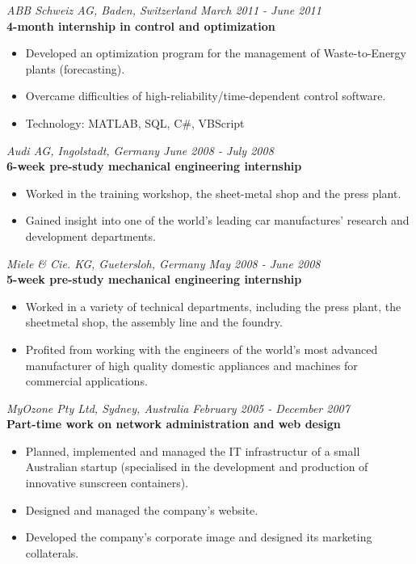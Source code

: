 \documentclass[margin]{res}
\begin{document}
\begin{resume}
  {\it ABB Schweiz AG, Baden, Switzerland \hfill March 2011 - June 2011} \\
  {\bf 4-month internship in control and optimization}
  \begin{itemize} \itemsep -0.5pt 
  \item Developed an optimization program for the management of Waste-to-Energy plants (forecasting).
  \item Overcame difficulties of high-reliability/time-dependent control software.
  \item Technology: MATLAB, SQL, C\#, VBScript
  \end{itemize}
  {\it Audi AG, Ingolstadt, Germany \hfill June 2008 - July 2008} \\
  {\bf 6-week pre-study mechanical engineering internship}
  \begin{itemize} \itemsep -0.5pt 
  \item Worked in the training workshop, the sheet-metal shop and the press plant.
  \item Gained insight into one of the world’s leading car manufactures’ research and development departments.
  \end{itemize}
  {\it Miele \& Cie. KG, Guetersloh, Germany \hfill May 2008 - June 2008} \\
  {\bf 5-week pre-study mechanical engineering internship}
  \begin{itemize} \itemsep -0.5pt
  \item Worked in a variety of technical departments, including the press plant, the sheetmetal shop, the assembly line and the foundry.
  \item Profited from working with the engineers of the world’s most advanced manufacturer of high quality domestic appliances and machines for commercial applications.
  \end{itemize}
  {\it MyOzone Pty Ltd, Sydney, Australia \hfill February 2005 - December 2007} \\
  {\bf Part-time work on network administration and web design}
  \begin{itemize} \itemsep -0.5pt
  \item Planned, implemented and managed the IT infrastructur of a small Australian startup (specialised in the development and production of innovative sunscreen containers).
  \item Designed and managed the company’s website.
  \item Developed the company’s corporate image and designed its marketing collaterals.

\end{itemize}
\end{resume}
\end{document}

